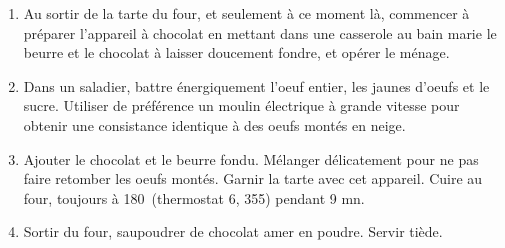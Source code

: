 \begin{recipe}
  \begin{enumerate}

  \item Au sortir de la tarte du four, et seulement \`a ce moment l\`a, commencer \`a
    pr\'eparer l'appareil \`a chocolat en mettant dans une casserole au bain
    marie le beurre et le chocolat \`a laisser doucement fondre, et op\'erer le
    m\'enage.


  \item Dans un saladier, battre \'energiquement l'oeuf entier, les jaunes
    d'oeufs et le sucre. Utiliser de pr\'ef\'erence un moulin \'electrique \`a
    grande vitesse pour obtenir une consistance identique \`a des oeufs
    mont\'es en neige.

  \item 
    Ajouter le chocolat et le beurre fondu. M\'elanger d\'elicatement pour ne
    pas faire retomber les oeufs mont\'es. Garnir la tarte avec cet appareil.
    Cuire au four, toujours \`a 180\degreeC\ (thermostat 6, 355\F)  pendant 9 mn.

  \item 
    Sortir du four, saupoudrer de chocolat amer en poudre. Servir ti\`ede.

  \end{enumerate}
\end{recipe}
